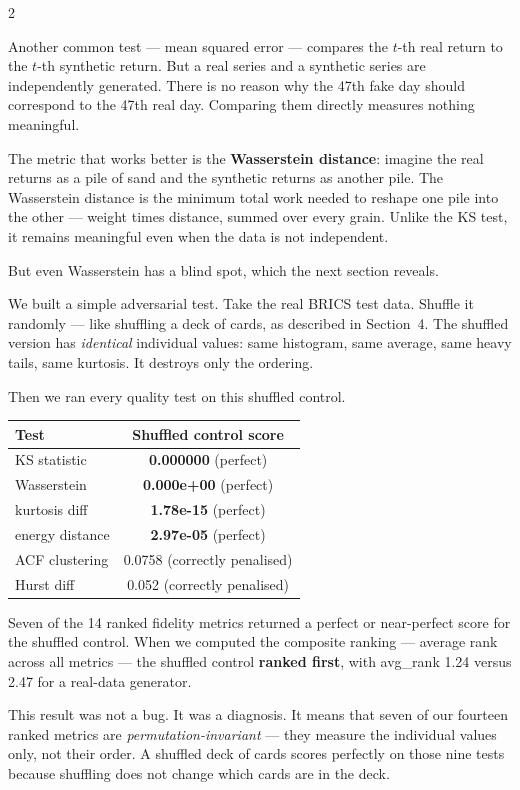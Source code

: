 \documentclass[10pt]{article}
\newcommand{\redbox}[2]{\begin{tcolorbox}[mybox={DRed}{RBg},title={#1}]#2\end{tcolorbox}}
\begin{document}
\begin{multicols}{2}
{Another common test --- mean squared error --- compares the $t$-th real return to the $t$-th synthetic return. But a real series and a synthetic series are independently generated. There is no reason why the 47th fake day should correspond to the 47th real day. Comparing them directly measures nothing meaningful.

The metric that works better is the \textbf{Wasserstein distance}: imagine the real returns as a pile of sand and the synthetic returns as another pile. The Wasserstein distance is the minimum total work needed to reshape one pile into the other --- weight times distance, summed over every grain. Unlike the KS test, it remains meaningful even when the data is not independent.

But even Wasserstein has a blind spot, which the next section reveals.}

\columnbreak

\redbox{7\quad The Shuffled Deck --- What We Discovered}{%
We built a simple adversarial test. Take the real BRICS test data. Shuffle it randomly --- like shuffling a deck of cards, as described in Section~4. The shuffled version has \emph{identical} individual values: same histogram, same average, same heavy tails, same kurtosis. It destroys only the ordering.

Then we ran every quality test on this shuffled control.

\medskip
\begin{tabular}{@{}lc@{}}
\toprule
Test & Shuffled control score \\
\midrule
KS statistic   & \textbf{0.000000} (perfect) \\
Wasserstein    & \textbf{0.000e+00} (perfect) \\
kurtosis diff  & \textbf{1.78e-15} (perfect) \\
energy distance & \textbf{2.97e-05} (perfect) \\
\midrule
ACF clustering & 0.0758 (correctly penalised) \\
Hurst diff     & 0.052 (correctly penalised) \\
\bottomrule
\end{tabular}

\medskip
Seven of the 14 ranked fidelity metrics returned a perfect or near-perfect score for the shuffled control. When we computed the composite ranking --- average rank across all metrics --- the shuffled control \textbf{ranked first}, with avg\_rank 1.24 versus 2.47 for a real-data generator.

This result was not a bug. It was a diagnosis. It means that seven of our fourteen ranked metrics are \emph{permutation-invariant} --- they measure the individual values only, not their order. A shuffled deck of cards scores perfectly on those nine tests because shuffling does not change which cards are in the deck.

}
\end{multicols}
\end{document}
